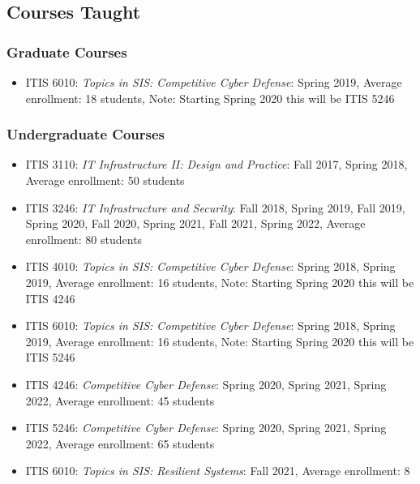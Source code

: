 
\hypertarget{courses}{%
\subsection{Courses Taught}\label{courses}}

\hypertarget{grad-courses}{%
\subsubsection{Graduate Courses}\label{grad-courses}}
\begin{itemize}
\tightlist
\item
  ITIS 6010: \emph{Topics in SIS: Competitive Cyber Defense}: Spring
  2019, Average enrollment: 18 students, Note: Starting Spring 2020 this will be ITIS 5246
\end{itemize}

\hypertarget{undergrad-courses}{%
\subsubsection{Undergraduate Courses}\label{undergrad-courses}}
\begin{itemize}
\tightlist
\item
  ITIS 3110: \emph{IT Infrastructure II: Design and Practice}: Fall 2017, Spring 2018, Average enrollment: 50 students

\item
  ITIS 3246: \emph{IT Infrastructure and Security}: Fall 2018, Spring 2019, Fall 2019, Spring 2020, Fall 2020, Spring 2021, Fall 2021, Spring 2022, Average enrollment: 80 students

\item
  ITIS 4010: \emph{Topics in SIS: Competitive Cyber Defense}: Spring 2018, Spring 2019, Average enrollment: 16 students, Note: Starting Spring 2020 this will be ITIS 4246

\item
  ITIS 6010: \emph{Topics in SIS: Competitive Cyber Defense}: Spring 2018, Spring 2019, Average enrollment: 16 students, Note: Starting Spring 2020 this will be ITIS 5246

\item
  ITIS 4246: \emph{Competitive Cyber Defense}: Spring 2020, Spring 2021, Spring 2022, Average enrollment: 45 students

\item
  ITIS 5246: \emph{Competitive Cyber Defense}: Spring 2020, Spring 2021, Spring 2022, Average enrollment: 65 students

\item
  ITIS 6010: \emph{Topics in SIS: Resilient Systems}: Fall 2021, Average enrollment: 8

\end{itemize}
